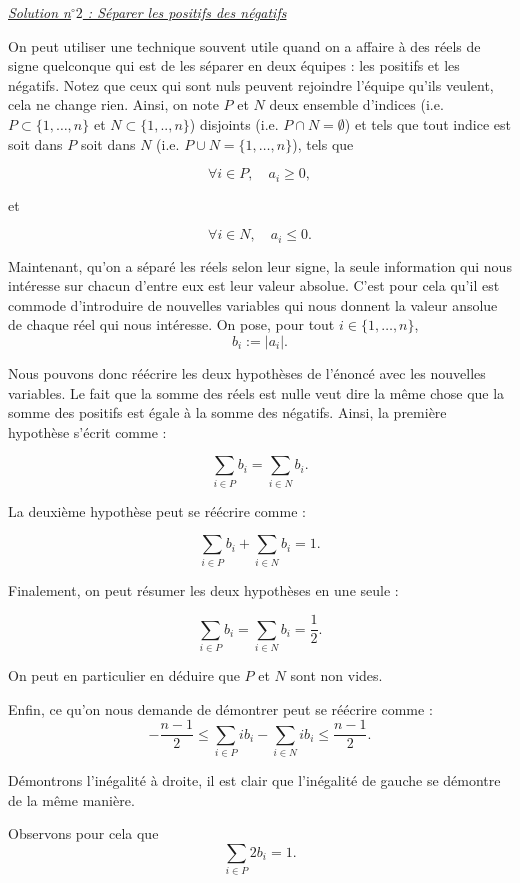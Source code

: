 \begin{sol}

\underline{\textit{Solution n$^\circ 2$ : Séparer les positifs des négatifs}}

On peut utiliser une technique souvent utile quand on a affaire à des réels de signe quelconque qui est de les séparer en deux équipes : les positifs et les négatifs. Notez que ceux qui sont nuls peuvent rejoindre l'équipe qu'ils veulent, cela ne change rien. Ainsi, on note $P$ et $N$ deux ensemble d'indices (i.e. $P \subset \{1,\dots,n\}$ et $N \subset \{1,..,n\}$) disjoints (i.e. $P \cap N = \emptyset$) et tels que tout indice est soit dans $P$ soit dans $N$ (i.e. $P \cup N =\{1,\dots,n\}$), tels que

\[
\forall i \in P, \quad a_i \geq 0,
\]

et

\[
\forall i \in N, \quad a_i \leq 0.
\]

Maintenant, qu'on a séparé les réels selon leur signe, la seule information qui nous intéresse sur chacun d'entre eux est leur valeur absolue. C'est pour cela qu'il est commode d'introduire de nouvelles variables qui nous donnent la valeur ansolue de chaque réel qui nous intéresse. On pose, pour tout $i \in \{1,\dots,n\}$,
\[
b_i := \vert a_i \vert.
\]

Nous pouvons donc réécrire les deux hypothèses de l'énoncé avec les nouvelles variables. Le fait que la somme des réels est nulle veut dire la même chose que la somme des positifs est égale à la somme des négatifs. Ainsi, la première hypothèse s'écrit comme :

\[
\sum_{i \in P} b_i = \sum_{i \in N} b_i.
\]

La deuxième hypothèse peut se réécrire comme :

\[
\sum_{i \in P} b_i + \sum_{i \in N} b_i =1.
\]

Finalement, on peut résumer les deux hypothèses en une seule :

\[
\sum_{i \in P} b_i = \sum_{i \in N} b_i = \frac12.
\]

On peut en particulier en déduire que $P$ et $N$ sont non vides.

Enfin, ce qu'on nous demande de démontrer peut se réécrire comme :
\[
-\frac{n-1}2 \leq \sum_{i \in P} ib_i - \sum_{i \in N} ib_i \leq \frac{n-1}2.
\]

Démontrons l'inégalité à droite, il est clair que l'inégalité de gauche se démontre de la même manière.

Observons pour cela que
\[
\sum_{i \in P} 2b_i =1.
\]


\end{sol}
